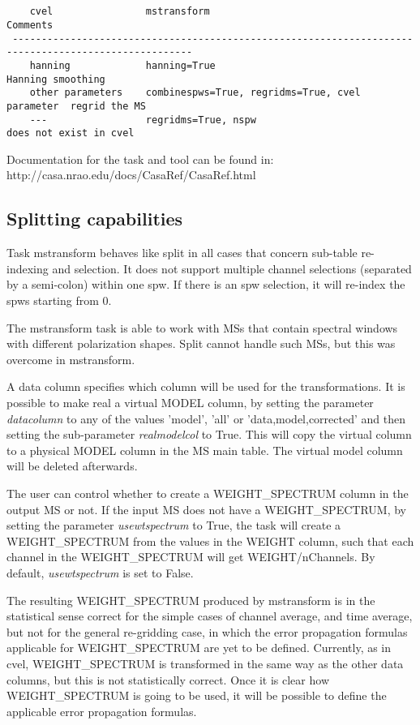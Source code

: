 \begin{verbatim}


    cvel                mstransform                                      Comments
 -----------------------------------------------------------------------------------------------------
    hanning             hanning=True                                     Hanning smoothing
    other parameters    combinespws=True, regridms=True, cvel parameter  regrid the MS
    ---                 regridms=True, nspw                              does not exist in cvel

\end{verbatim}


Documentation for the task and tool can be found in:
 {http://casa.nrao.edu/docs/CasaRef/CasaRef.html}

\subsection{Splitting capabilities}
Task mstransform behaves like split in all cases that concern sub-table re-indexing
and selection. It does not support multiple channel selections (separated by a
semi-colon) within one spw. If there is an spw selection, it will re-index the
spws starting from 0.

The mstransform task is able to work with MSs that contain spectral windows with 
different polarization shapes. Split cannot handle such MSs, but this was overcome 
in mstransform.

A data column specifies which column will be used for the transformations. It is
possible to make real a virtual MODEL column, by setting the parameter
{\it datacolumn} to any of the values 'model', 'all' or 'data,model,corrected'
and then setting the sub-parameter {\it realmodelcol} to True. This will copy the virtual
column to a physical MODEL column in the MS main table. The virtual model column
will be deleted afterwards.

The user can control whether to create a WEIGHT_SPECTRUM column in the output MS or
not. If the input MS does not have a WEIGHT_SPECTRUM, by setting the parameter
{\it usewtspectrum} to True, the task will create a WEIGHT_SPECTRUM from the values
in the WEIGHT column, such that each channel in the WEIGHT_SPECTRUM will get WEIGHT/nChannels.
By default, {\it usewtspectrum} is set to False.

The resulting WEIGHT_SPECTRUM produced by mstransform is in the statistical sense 
correct for the simple cases of channel average, and time average, but not for the 
general re-gridding case, in which the error propagation formulas applicable for 
WEIGHT_SPECTRUM are yet to be defined. Currently, as in cvel, WEIGHT_SPECTRUM is 
transformed in the same way as the other data columns, but this is not statistically 
correct. Once it is clear how WEIGHT_SPECTRUM is going to be used, it will be possible 
to define the applicable error propagation formulas.

